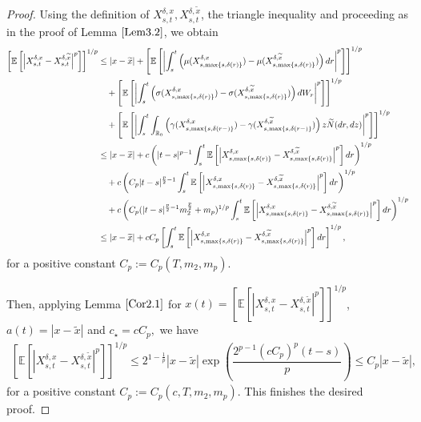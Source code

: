 \documentclass[11pt]{article}
\theoremstyle{theorem}
\theoremstyle{definition}
\newcommand{\bR}{\mathbb{R}}
\newcommand{\1}{{\bf 1}}
\begin{document}
\begin{proof}
  Using the definition of $X^{\delta, x}_{s,t}, X^{\delta, \widetilde{x}}_{s,t}$, the triangle inequality and proceeding as in the proof of Lemma $\ref{Lem3.2}$, we obtain  
\begin{align*}
\left[\mathbb{E}\left[\left|X^{\delta, x}_{s,t}-X^{\delta, \widetilde{x}}_{s,t}\right|^p\right]\right]^{1/p} & \leq |x-\widetilde{x}| + \left[\mathbb{E} \left[\left| \int_s^t 
 \left (\mu(X_{s,\max\{s,\delta(r)\}}^{\delta,x}) -\mu(X_{s,\max\{s,\delta(r)\}}^{\delta,\widetilde{x}}) \right) dr \right|^p \right]\right]^{1/p} \notag\\
& \quad + \left[\mathbb{E} \left[\left| \int_s^t \left( \sigma(X_{s,\max\{s,\delta(r)\}}^{\delta,x}) -\sigma(X_{s,\max\{s,\delta(r)\}}^{\delta,\widetilde{x}})\right) dW_r \right|^p \right]\right]^{1/p}\notag \\
& \quad + \left[\mathbb{E} \left[\left| \int_s^t \int_{\bR_0} \left(\gamma (X_{s,\max\{s,\delta(r-)\}}^{\delta,x})-\gamma (X_{s,\max\{s,\delta(r-)\}}^{\delta,\widetilde{x}}) \right) z \widetilde{N}(dr, dz)  \right|^p \right]\right]^{1/p} \notag \\
& \leq |x-\widetilde{x}| +  c \left( |t-s|^{p-1} \int_s^t \mathbb{E} \left[ \left| X_{s,\max\{s,\delta(r)\}}^{\delta,x} -X_{s,\max\{s,\delta(r)\}}^{\delta,\widetilde{x}}
\right|^p\right] dr \right)^{1/p} \\
&\quad + c \left( C_{p} |t-s|^{\frac{p}{2}-1} \int_s^t \mathbb{E} \left[ \left| X_{s,\max\{s,\delta(r)\}}^{\delta,x} -X_{s,\max\{s,\delta(r)\}}^{\delta,\widetilde{x}} \right|^p\right] dr \right)^{1/p} \notag\\
& \quad  + c \left( C_{p} (|t-s|^{\frac{p}{2}-1}m_2^{\frac{p}{2}}+m_p )^{1/p} \int_s^t \mathbb{E} \left[ \left|  X_{s,\max\{s,\delta(r)\}}^{\delta,x} -X_{s,\max\{s,\delta(r)\}}^{\delta,\widetilde{x}} \right|^p\right] dr \right)^{1/p} \notag\\
& \leq |x-\widetilde{x}| + c C_p \left[ \int_s^t \mathbb{E} \left[\left| X_{s,\max\{s,\delta(r)\}}^{\delta,x} -X_{s,\max\{s,\delta(r)\}}^{\delta,\widetilde{x}}  \right|^p\right] dr \right]^{1/p},
\end{align*}
for a positive constant $C_p:= C_p (T, m_2, m_p).$

Then, applying Lemma $\ref{Cor2.1}$ for $x(t)= \left[\mathbb{E}\left[\left|X^{\delta, x}_{s,t}-X^{\delta, \widetilde{x}}_{s,t}\right|^p\right]\right]^{1/p} $, $a(t)=|x-\widetilde{x}|$ and $c_{\star}=c C_p,$ we have
\begin{align*}
\left[\mathbb{E}\left[\left|X^{\delta, x}_{s,t}-X^{\delta, \widetilde{x}}_{s,t}\right|^p\right]\right]^{1/p} \le 2^{1-\frac{1}{p}} |x-\widetilde{x}| \exp \left(\dfrac{2^{p-1} (c C_p)^p (t-s)}{p}\right) \leq C_p |x-\widetilde{x}| , 
\end{align*}
for a positive constant $C_p:= C_p (c, T, m_2, m_p).$ This finishes the desired proof.
\end{proof}
\end{document}
